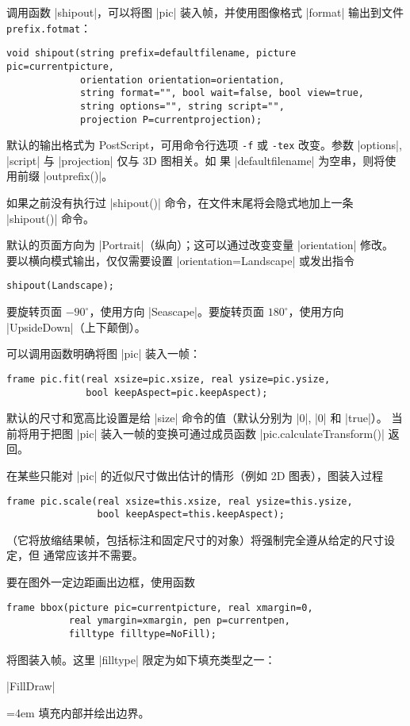 \documentclass[nofonts,CJKnormalspaces]{ctexbook}[2009/05/20]
\makeatletter
\newenvironment{funclist}{\trivlist
  \parindent=0pt
\item[]
  \def\item{\medskip\par\leftskip=0pt}
  \def\go{\par\leftskip=4em}}
{\endtrivlist}
\newenvironment{typelist}{\itemize
  \let\old@item\@item
  \def\@item[##1]{\expandafter\old@item[\ttfamily\color{type!50!black}##1]}}
{\enditemize}
\newcommand*\prgname[1]{\textsf{#1}}
\makeatother
\begin{document}
\begin{typelist}
调用函数 |shipout|，可以将图 |pic| 装入帧，并使用图像格式 |format| 输出到文件
\verb=prefix.fotmat=：
\begin{lstlisting}
void shipout(string prefix=defaultfilename, picture pic=currentpicture,
             orientation orientation=orientation,
             string format="", bool wait=false, bool view=true,
             string options="", string script="",
             projection P=currentprojection);
\end{lstlisting}
默认的输出格式为 \prgname{PostScript}，可用命令行选项 \verb=-f= 或
\verb=-tex= 改变。参数 |options|, |script| 与 |projection| 仅与 3D 图相关。如
果 |defaultfilename| 为空串，则将使用前缀 |outprefix()|。

如果之前没有执行过 |shipout()| 命令，在文件末尾将会隐式地加上一条 |shipout()|
命令。

默认的页面方向为 |Portrait|（纵向）；这可以通过改变变量 |orientation| 修改。
要以横向模式输出，仅仅需要设置 |orientation=Landscape| 或发出指令
\begin{lstlisting}
shipout(Landscape);
\end{lstlisting}
要旋转页面 $-90^\circ$，使用方向 |Seascape|。要旋转页面 $180^\circ$，使用方向
|UpsideDown|（上下颠倒）。

可以调用函数明确将图 |pic| 装入一帧：
\begin{lstlisting}
frame pic.fit(real xsize=pic.xsize, real ysize=pic.ysize,
              bool keepAspect=pic.keepAspect);
\end{lstlisting}
默认的尺寸和宽高比设置是给 |size| 命令的值（默认分别为 |0|, |0| 和 |true|）。
当前将用于把图 |pic| 装入一帧的变换可通过成员函数
|pic.calculateTransform()| 返回。

在某些只能对 |pic| 的近似尺寸做出估计的情形（例如 2D 图表），图装入过程
\begin{lstlisting}
frame pic.scale(real xsize=this.xsize, real ysize=this.ysize,
                bool keepAspect=this.keepAspect);
\end{lstlisting}
（它将放缩结果帧，包括标注和固定尺寸的对象）将强制完全遵从给定的尺寸设定，但
通常应该并不需要。

要在图外一定边距画出边框，使用函数
\begin{lstlisting}
frame bbox(picture pic=currentpicture, real xmargin=0,
           real ymargin=xmargin, pen p=currentpen,
           filltype filltype=NoFill);
\end{lstlisting}
将图装入帧。这里 |filltype| 限定为如下填充类型之一：
\begin{funclist}
\item |FillDraw| \go
  填充内部并绘出边界。


\end{funclist}
\end{typelist}
\end{document}
